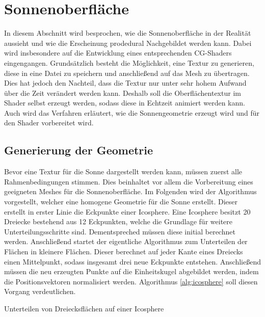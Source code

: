 \section{Sonnenoberfläche}
In diesem Abschnitt wird besprochen, wie die Sonnenoberfläche in der Realität
aussieht und wie die Erscheinung prodedural Nachgebildet werden kann. Dabei
wird insbesondere auf die Entwicklung eines entsprechenden CG-Shaders
eingengangen. Grundsätzlich besteht die Möglichkeit, eine Textur zu
generieren, diese in eine Datei zu speichern und anschließend auf das Mesh zu
übertragen. Dies hat jedoch den Nachteil, dass die Textur nur unter sehr
hohem Aufwand über die Zeit verändert werden kann. Deshalb soll die
Oberflächentextur im Shader selbst erzeugt werden, sodass diese in Echtzeit
animiert werden kann. Auch wird das Verfahren erläutert, wie die
Sonnengeometrie erzeugt wird und für den Shader vorbereitet wird.

\subsection{Generierung der Geometrie} 
Bevor eine Textur für die Sonne dargestellt werden kann, müssen zuerst alle
Rahmenbedingungen stimmen. Dies beinhaltet vor allem die Vorbereitung eines
geeigneten Meshes für die Sonnenoberfläche. Im Folgenden wird der Algorithmus
vorgestellt, welcher eine homogene Geometrie für die Sonne erstellt. Dieser
erstellt in erster Linie die Eckpunkte einer Icosphere. Eine Icosphere
besitzt 20 Dreiecke bestehend aus 12 Eckpunkten, welche die Grundlage für
weitere Unterteilungsschritte sind. Dementspreched müssen diese initial
berechnet werden. Anschließend startet der eigentliche Algorithmus zum
Unterteilen der Flächen in kleinere Flächen. Dieser berechnet auf jeder Kante
eines Dreiecks einen Mittelpunkt, sodass insgesamt drei neue Eckpunkte entstehen.
Anschließend müssen die neu erzeugten Punkte auf die Einheitskugel abgebildet werden,
indem die Positionsvektoren normalisiert werden. Algorithmus \ref{alg:icosphere}
soll diesen Vorgang verdeutlichen.

\begin{algorithm}
  \caption{Unterteilen von Dreiecksflächen auf einer Icosphere}
  \label{alg:icosphere}
  \SetAlgoLined


  \BlankLine
\end{algorithm}

